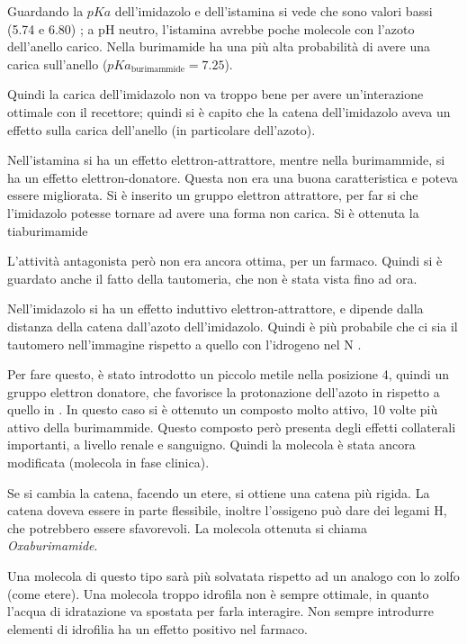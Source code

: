 Guardando la $pKa$ dell'imidazolo e dell'istamina si vede che sono valori
bassi (5.74 e 6.80) ; a pH neutro, l'istamina avrebbe poche molecole con l'azoto
dell'anello carico. Nella burimamide ha una più alta probabilità di
avere una carica sull'anello ($pKa_{\text{burimammide}} = 7.25$).


Quindi la carica dell'imidazolo non va troppo bene per avere
un'interazione ottimale con il recettore; quindi si è capito che la
catena dell'imidazolo aveva un effetto sulla carica dell'anello (in
particolare dell'azoto).

Nell'istamina si ha un effetto elettron-attrattore, mentre nella
burimammide, si ha un effetto elettron-donatore. Questa non era una buona
caratteristica e poteva essere migliorata. Si è inserito un gruppo
elettron attrattore, per far si che l'imidazolo potesse tornare ad avere una forma non carica. Si è ottenuta la tiaburimamide


L'attività antagonista però non era ancora ottima, per un farmaco.
Quindi si è guardato anche il fatto della tautomeria, che non è stata
vista fino ad ora.

Nell'imidazolo si ha un effetto induttivo elettron-attrattore, e dipende
dalla distanza della catena dall'azoto dell'imidazolo. Quindi è più
probabile che ci sia il tautomero nell'immagine rispetto a quello con
l'idrogeno nel N \pi.

Per fare questo, è stato introdotto un piccolo metile nella posizione 4,
quindi un gruppo elettron donatore, che favorisce la protonazione
dell'azoto in \tau{} rispetto a quello in \pi. In questo caso si è
ottenuto un composto molto attivo, 10 volte più attivo della burimammide.
Questo composto però presenta degli effetti collaterali importanti, a
livello renale e sanguigno.
Quindi la molecola è stata ancora modificata (molecola in fase clinica).


Se si cambia la catena, facendo un etere, si ottiene una catena più
rigida. La catena doveva essere in parte flessibile, inoltre l'ossigeno
può dare dei legami H, che potrebbero essere sfavorevoli. La molecola ottenuta si chiama \emph{Oxaburimamide}.


Una molecola di questo tipo sarà più solvatata rispetto ad un analogo
con lo zolfo (come etere). Una molecola troppo idrofila non è sempre
ottimale, in quanto l'acqua di idratazione va spostata per farla
interagire. Non sempre introdurre elementi di idrofilia ha un effetto
positivo nel farmaco.


